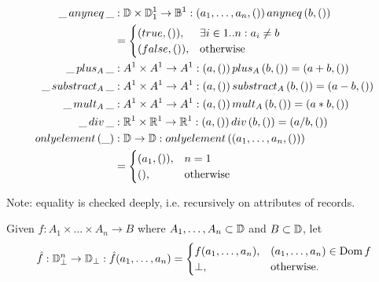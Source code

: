 \begin{defbox}
\begin{align*}
\sanyneq{\_}{\_} &: \sdom \times \ssingledom^1 \to \sboolean^1 : \sanyneq{(a_1, \dots, a_n, ())}{(b, ())} \\
&= \begin{cases}
(true, ()), & \exists i \in 1..n : a_i \neq b \\
(false, ()), & \text{otherwise}
\end{cases} \\
\splus{A}{\_}{\_} &: A^1 \times A^1 \to A^1 : \splus{A}{(a, ())}{(b, ())} = (a + b, ()) \\
\ssubs{A}{\_}{\_} &: A^1 \times A^1 \to A^1 : \ssubs{A}{(a, ())}{(b, ())} = (a - b, ()) \\
\smult{A}{\_}{\_} &: A^1 \times A^1 \to A^1 : \smult{A}{(a, ())}{(b, ())} = (a * b, ()) \\
\sdiv{\_}{\_} &: \snumber^1 \times \snumber^1 \to \snumber^1 : \sdiv{(a, ())}{(b, ())} = (a / b, ()) \\
\sonlyelement{\_} &: \sdom \to \sdom : \sonlyelement{(a_1, \dots, a_n, ())} \\
&= \begin{cases}
(a_1, ()), & n = 1 \\
(), & \text{otherwise}
\end{cases}
\end{align*}

Note: equality is checked deeply, i.e. recursively on attributes of records.


Given $f : A_1 \times \dots \times A_n \to B$ where $A_1, \dots, A_n \subset \sdom$ and $B \subset \sdom$, let
\begin{equation*}
\hat{f} : \sdom_\bot^n \to \sdom_\bot : \hat{f}(a_1, \dots, a_n) =
\begin{cases}
f(a_1, \dots, a_n), & (a_1, \dots, a_n) \in \dom{f} \\
\bot, & \text{otherwise.}
\end{cases}
\end{equation*}
\end{defbox}
